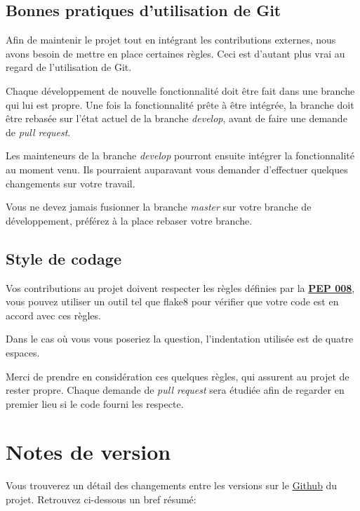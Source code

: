 \documentclass[letterpaper,10pt,english]{sphinxmanual}
\begin{document}
\subsection{Bonnes pratiques d'utilisation de Git}
\label{contribute:good-practices-with-git}
Afin de maintenir le projet tout en intégrant les contributions externes, nous avons besoin de mettre en place certaines règles. Ceci est d'autant plus vrai au regard de l'utilisation de Git.

Chaque développement de nouvelle fonctionnalité doit être fait dans une branche qui lui est propre. Une fois la fonctionnalité prête à être intégrée, la branche doit être rebasée sur l'état actuel de la branche \emph{develop}, avant de faire une demande de \emph{pull request}.

Les mainteneurs de la branche \emph{develop} pourront ensuite intégrer la fonctionnalité au moment venu. Ils pourraient auparavant vous demander d'effectuer quelques changements sur votre travail.

Vous ne devez jamais fusionner la branche \emph{master} sur votre branche de développement, préférez à la place rebaser votre branche.


\subsection{Style de codage}
\label{contribute:coding-style}
Vos contributions au projet doivent respecter les règles définies par la \href{http://www.python.org/dev/peps/pep-0008}{\textbf{PEP 008}}, vous pouvez utiliser un outil tel que flake8 pour vérifier que votre code est en accord avec ces règles.

Dans le cas où vous vous poseriez la question, l'indentation utilisée est de quatre espaces.

Merci de prendre en considération ces quelques règles, qui assurent au projet de rester propre. Chaque demande de \emph{pull request} sera étudiée afin de regarder en premier lieu si le code fourni les respecte.


\section{Notes de version}
\label{changelog::doc}\label{changelog:changelog}
Vous trouverez un détail des changements entre les versions sur le \href{https://github.com/onitu/onitu/releases}{Github} du projet. Retrouvez ci-dessous un bref résumé:
\end{document}
